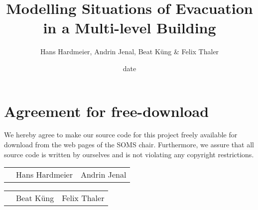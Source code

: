 \documentclass[11pt]{article}
\title{Modelling Situations of Evacuation in a Multi-level Building}
\author{Hans Hardmeier, Andrin Jenal, Beat Küng & Felix Thaler}
\date{date}
\begin{document}

\newpage


\newpage
\section*{Agreement for free-download}
\bigskip


\bigskip


\large We hereby agree to make our source code for this project freely available for download from the web pages of the SOMS chair. Furthermore, we assure that all source code is written by ourselves and is not violating any copyright restrictions.

\begin{center}

\bigskip
\bigskip
\bigskip
\bigskip


\begin{tabular}{@{}p{3.3cm}@{}p{6cm}@{}@{}p{6cm}@{}}

\begin{minipage}{3cm}

\end{minipage}
&
\begin{minipage}{6cm}
\vspace{2mm} \large Hans Hardmeier

 \vspace{\baselineskip}

\end{minipage}
&
\begin{minipage}{6cm}

\large Andrin Jenal

\end{minipage}

\end{tabular}

\bigskip
\bigskip
\bigskip
\bigskip


\begin{tabular}{@{}p{3.3cm}@{}p{6cm}@{}@{}p{6cm}@{}}

\begin{minipage}{3cm}

\end{minipage}
&
\begin{minipage}{6cm}
\vspace{2mm} \large Beat Küng

 \vspace{\baselineskip}

\end{minipage}
&
\begin{minipage}{6cm}

\large Felix Thaler

\end{minipage}
\end{tabular}

\end{center}
\newpage
\end{document}

